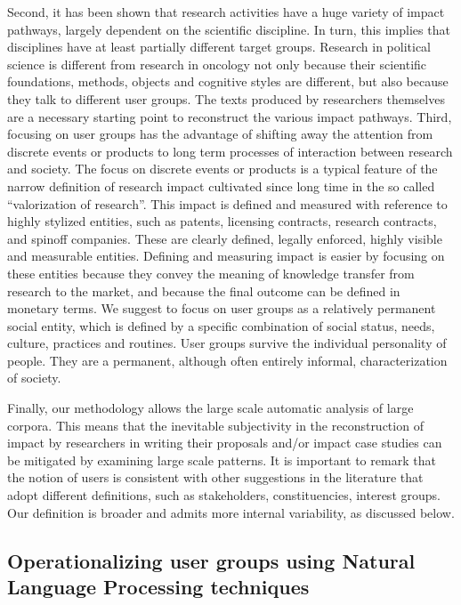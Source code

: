 \documentclass[]{book}
\theoremstyle{definition}
\theoremstyle{definition}
\theoremstyle{definition}
\theoremstyle{remark}
\begin{document}
Second, it has been shown that research activities have a huge variety
of impact pathways, largely dependent on the scientific discipline. In
turn, this implies that disciplines have at least partially different
target groups. Research in political science is different from research
in oncology not only because their scientific foundations, methods,
objects and cognitive styles are different, but also because they talk
to different user groups. The texts produced by researchers themselves
are a necessary starting point to reconstruct the various impact
pathways. Third, focusing on user groups has the advantage of shifting
away the attention from discrete events or products to long term
processes of interaction between research and society. The focus on
discrete events or products is a typical feature of the narrow
definition of research impact cultivated since long time in the so
called ``valorization of research''. This impact is defined and measured
with reference to highly stylized entities, such as patents, licensing
contracts, research contracts, and spinoff companies. These are clearly
defined, legally enforced, highly visible and measurable entities.
Defining and measuring impact is easier by focusing on these entities
because they convey the meaning of knowledge transfer from research to
the market, and because the final outcome can be defined in monetary
terms. We suggest to focus on user groups as a relatively permanent
social entity, which is defined by a specific combination of social
status, needs, culture, practices and routines. User groups survive the
individual personality of people. They are a permanent, although often
entirely informal, characterization of society.

Finally, our methodology allows the large scale automatic analysis of
large corpora. This means that the inevitable subjectivity in the
reconstruction of impact by researchers in writing their proposals
and/or impact case studies can be mitigated by examining large scale
patterns. It is important to remark that the notion of users is
consistent with other suggestions in the literature that adopt different
definitions, such as stakeholders, constituencies, interest groups. Our
definition is broader and admits more internal variability, as discussed
below.

\subsection{Operationalizing user groups using Natural Language
Processing
techniques}\label{operationalizing-user-groups-using-natural-language-processing-techniques}
\end{document}
